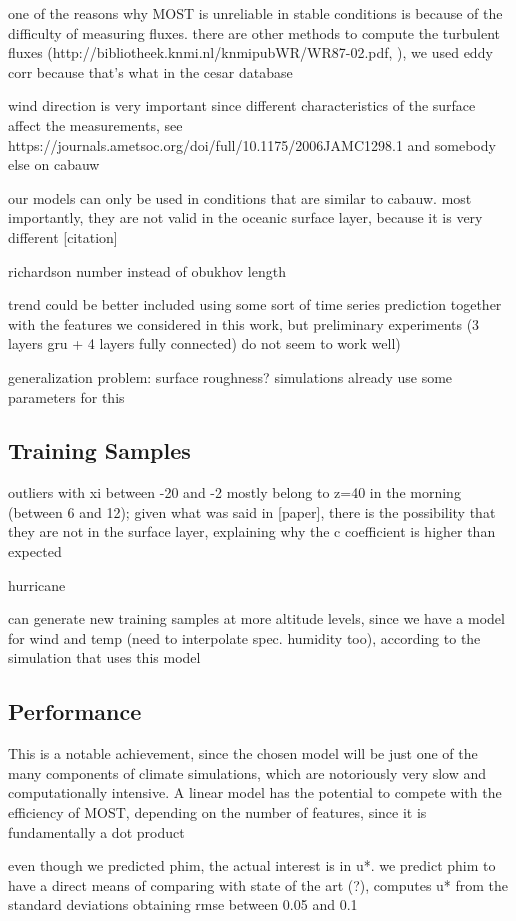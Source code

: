 \documentclass[a4paper]{book}
\begin{document}
one of the reasons why MOST is unreliable in stable conditions is because of the difficulty of measuring fluxes. there are other methods to compute the turbulent fluxes (http://bibliotheek.knmi.nl/knmipubWR/WR87-02.pdf, ), we used eddy corr because that's what in the cesar database

wind direction is very important since different characteristics of the surface affect the measurements, see https://journals.ametsoc.org/doi/full/10.1175/2006JAMC1298.1 and somebody else on cabauw

our models can only be used in conditions that are similar to cabauw. most importantly, they are not valid in the oceanic surface layer, because it is very different [citation]

richardson number instead of obukhov length


trend could be better included using some sort of time series prediction together with the features we considered in this work, but preliminary experiments (3 layers gru + 4 layers fully connected) do not seem to work well)


generalization problem: surface roughness? simulations already use some parameters for this

\subsection{Training Samples}
outliers with xi between -20 and -2 mostly belong to z=40 in the morning (between 6 and 12); given what was said in [paper], there is the possibility that they are not in the surface layer, explaining why the c coefficient is higher than expected

hurricane

can generate new training samples at more altitude levels, since we have a model for wind and temp (need to interpolate spec. humidity too), according to the simulation that uses this model


\subsection{Performance}
This is a notable achievement, since the chosen model will be just one of the many components of climate simulations, which are notoriously very slow and computationally intensive. A linear model has the potential to compete with the efficiency of MOST, depending on the number of features, since it is fundamentally a dot product

even though we predicted phim, the actual interest is in u*. we predict phim to have a direct means of comparing with state of the art (?), \cite{weber1999} computes u* from the standard deviations obtaining rmse between 0.05 and 0.1
\end{document}
